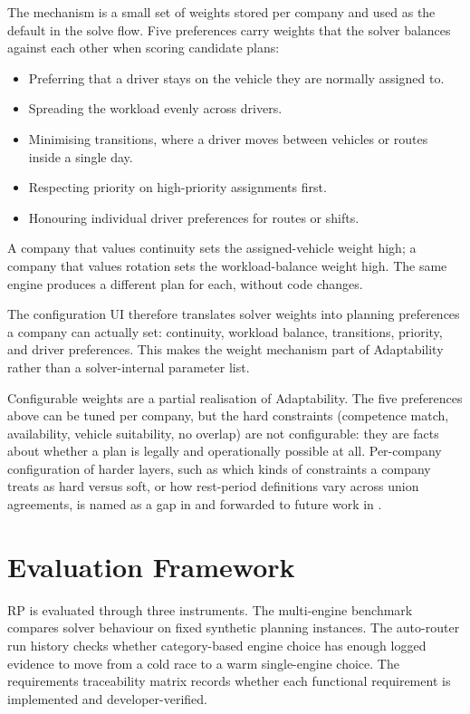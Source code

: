 The mechanism is a small set of weights stored per company and used as the default in the solve flow. Five preferences carry weights that the solver balances against each other when scoring candidate plans:

\begin{itemize}
  \item Preferring that a driver stays on the vehicle they are normally assigned to.
  \item Spreading the workload evenly across drivers.
  \item Minimising transitions, where a driver moves between vehicles or routes inside a single day.
  \item Respecting priority on high-priority assignments first.
  \item Honouring individual driver preferences for routes or shifts.
\end{itemize}

A company that values continuity sets the assigned-vehicle weight high; a company that values rotation sets the workload-balance weight high. The same engine produces a different plan for each, without code changes.

The configuration UI therefore translates solver weights into planning preferences a company can actually set: continuity, workload balance, transitions, priority, and driver preferences. This makes the weight mechanism part of Adaptability rather than a solver-internal parameter list.

Configurable weights are a partial realisation of Adaptability. The five preferences above can be tuned per company, but the hard constraints (competence match, availability, vehicle suitability, no overlap) are not configurable: they are facts about whether a plan is legally and operationally possible at all. Per-company configuration of harder layers, such as which kinds of constraints a company treats as hard versus soft, or how rest-period definitions vary across union agreements, is named as a gap in  and forwarded to future work in .

\section{Evaluation Framework}
\label{sec:evaluation-framework}

RP is evaluated through three instruments. The multi-engine benchmark compares solver behaviour on fixed synthetic planning instances. The auto-router run history checks whether category-based engine choice has enough logged evidence to move from a cold race to a warm single-engine choice. The requirements traceability matrix records whether each functional requirement is implemented and developer-verified.

